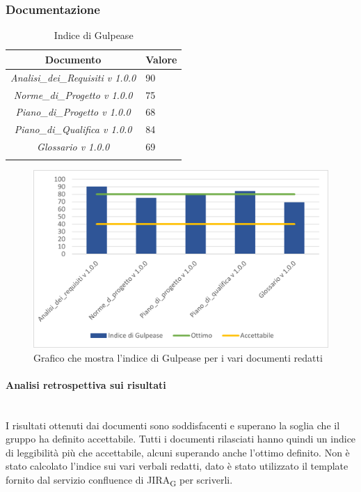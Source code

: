 \subsubsection{Documentazione}
\begin{table}[H]
	\centering
	\setlength\extrarowheight{5pt}
	\renewcommand\tabularxcolumn[1]{>{\Centering}m{#1}}
	\begin{tabularx}{\textwidth}{| c | X |} 
		\hline
		\rowcolor{white}
		\textbf{Documento} & \textbf{Valore}\\
		\hline
		\textit{Analisi\_dei\_Requisiti v 1.0.0} & 90 \\
		\hline
		\textit{Norme\_di\_Progetto v 1.0.0} & 75\\
		\hline
		\textit{Piano\_di\_Progetto v 1.0.0} & 68\\
		\hline
		\textit{Piano\_di\_Qualifica v 1.0.0} & 84\\
		\hline
		\textit{Glossario v 1.0.0} & 69\\
		\hline
		\rowcolor{white}
		\caption{Indice di Gulpease}
	\end{tabularx}
\end{table}
\begin{figure}[H]
	\centering
	\includegraphics[scale=1.1]{img/Gulpease.png}
	\caption{Grafico che mostra l'indice di Gulpease per i vari documenti redatti}
\end{figure}
\paragraph{Analisi retrospettiva sui risultati}\mbox{}\\
I risultati ottenuti dai documenti sono soddisfacenti e superano la soglia che il gruppo ha definito accettabile. Tutti i documenti rilasciati hanno quindi un indice di leggibilità più che accettabile, alcuni superando anche l'ottimo definito. Non è stato calcolato l'indice sui vari verbali redatti, dato è stato utilizzato il template fornito dal servizio confluence di JIRA\textsubscript{G} per scriverli.




